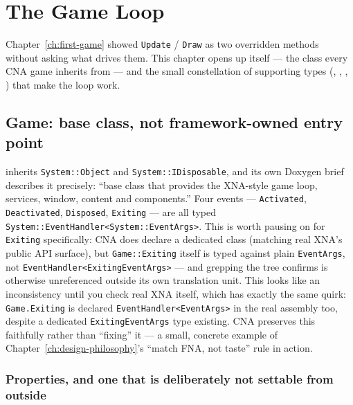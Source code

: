 \chapter{The Game Loop}
\label{ch:game-loop}

Chapter~\ref{ch:first-game} showed \texttt{Update} / \texttt{Draw} as two overridden methods
without asking what drives them. This chapter opens up  itself --- the class
every CNA game inherits from --- and the small constellation of supporting types
(, , ,
) that make the loop work.

\section{Game: base class, not framework-owned entry point}

 inherits \texttt{System::Object} and \texttt{System::IDisposable}, and its
own Doxygen brief describes it precisely: ``base class that provides the XNA-style game
loop, services, window, content and components.'' Four events --- \texttt{Activated},
\texttt{Deactivated}, \texttt{Disposed}, \texttt{Exiting} --- are all typed
\texttt{System::EventHandler<System::EventArgs>}. This is worth pausing on for
\texttt{Exiting} specifically: CNA does declare a dedicated  class
(matching real XNA's public API surface), but \texttt{Game::Exiting} itself is typed against
plain \texttt{EventArgs}, not \texttt{EventHandler<ExitingEventArgs>} --- and grepping the
tree confirms  is otherwise unreferenced outside its own
translation unit. This looks like an inconsistency until you check real XNA itself, which
has exactly the same quirk: \texttt{Game.Exiting} is declared \texttt{EventHandler<EventArgs>}
in the real assembly too, despite a dedicated \texttt{ExitingEventArgs} type existing.
CNA preserves this faithfully rather than ``fixing'' it --- a small, concrete example of
Chapter~\ref{ch:design-philosophy}'s ``match FNA, not taste'' rule in action.

\subsection{Properties, and one that is deliberately not settable from outside}

